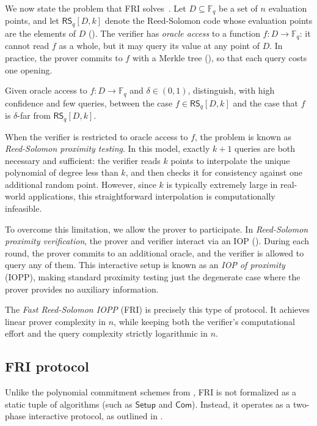 \documentclass[../../book]{subfiles}
\begin{document}
We now state the problem that FRI solves~\cite{bensasson18}. Let $D \subseteq \mathbb{F}_q$ be a set of $n$ evaluation points, and let $\mathsf{RS}_q[D,k]$ denote the Reed-Solomon code whose evaluation points are the elements of $D$ (). The verifier has \emph{oracle access} to a function $f : D \to \mathbb{F}_q$: it cannot read $f$ as a whole, but it may query its value at any point of $D$.
In practice, the prover commits to $f$ with a Merkle tree (), so that each query costs one opening.

\begin{definition}\label{def:rs-proximity}
  Given oracle access to $f : D \to \mathbb{F}_q$ and $\delta \in (0,1)$, distinguish, with high confidence and few queries, between the case $f \in \mathsf{RS}_q[D,k]$ and the case that $f$ is $\delta$-far from $\mathsf{RS}_q[D,k]$.
\end{definition}

When the verifier is restricted to oracle access to $f$, the problem is known as \emph{Reed-Solomon proximity testing}. In this model, exactly $k+1$ queries are both necessary and sufficient: the verifier reads $k$ points to interpolate the unique polynomial of degree less than $k$, and then checks it for consistency against one additional random point. However, since $k$ is typically extremely large in real-world applications, this straightforward interpolation is computationally infeasible.

To overcome this limitation, we allow the prover to participate. In \emph{Reed-Solomon proximity verification}, the prover and verifier interact via an IOP (). During each round, the prover commits to an additional oracle, and the verifier is allowed to query any of them. This interactive setup is known as an \emph{IOP of proximity} (IOPP), making standard proximity testing just the degenerate case where the prover provides no auxiliary information.

The \emph{Fast Reed-Solomon IOPP} (FRI) is precisely this type of protocol. It achieves linear prover complexity in $n$, while keeping both the verifier's computational effort and the query complexity strictly logarithmic in $n$.

\subsection{FRI protocol}\label{subsec:fri}
Unlike the polynomial commitment schemes from , FRI is not formalized as a static tuple of algorithms (such as $\mathsf{Setup}$ and $\mathsf{Com}$). Instead, it operates as a two-phase interactive protocol, as outlined in .
\end{document}
